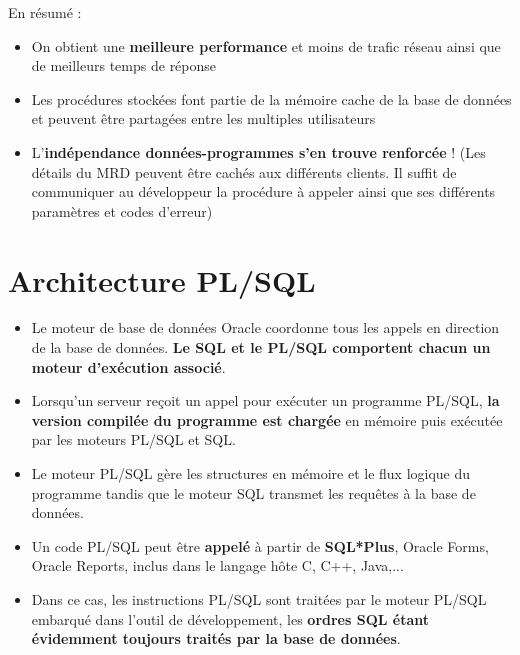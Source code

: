 \documentclass[10pt]{beamer}
\begin{document}
\begin{frame}[allowframebreaks]{\secname}
    En résumé :
    \begin{itemize}
        \item On obtient une \textbf{meilleure performance} et moins de trafic réseau ainsi que de meilleurs temps de réponse
        \item Les procédures stockées font partie de la mémoire cache de la base de données et peuvent être partagées entre les multiples utilisateurs
        \item L'\textbf{indépendance données-programmes s'en trouve renforcée} ! (Les détails du MRD peuvent être cachés aux différents clients.  Il suffit de communiquer au développeur la procédure à appeler ainsi que ses différents paramètres et codes d'erreur)
    \end{itemize}
\end{frame}

\section{Architecture PL/SQL}
\begin{frame}{\secname}
    \begin{itemize}
        \item Le moteur de base de données Oracle coordonne tous les appels en direction de la base de données. \textbf{Le SQL et le PL/SQL comportent chacun un moteur d'exécution associé}.
        \item Lorsqu'un serveur reçoit un appel pour exécuter un programme PL/SQL, \textbf{la version compilée du programme est chargée} en mémoire puis exécutée par les moteurs PL/SQL et SQL.
        \item Le moteur PL/SQL gère les structures en mémoire et le flux logique du programme tandis que le moteur SQL transmet les requêtes à la base de données.
    \end{itemize}
\end{frame}

\begin{frame}{\secname}
    \begin{itemize}
        \item Un code PL/SQL peut être \textbf{appelé} à partir de \textbf{SQL*Plus}, Oracle Forms, Oracle Reports, inclus dans le langage hôte C, C++, Java,...
        \item Dans ce cas, les instructions PL/SQL sont traitées par le moteur PL/SQL embarqué dans l'outil de développement, les \textbf{ordres SQL étant évidemment toujours traités par la base de données}.
    \end{itemize}
\end{frame}
\end{document}

